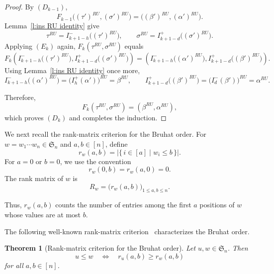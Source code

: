 \documentclass[12pt]{amsart}
\newtheorem{thm}{Theorem}[section]
\theoremstyle{definition}
\numberwithin{equation}{section}
\begin{document}
\begin{proof}
By $(D_{k-1})$,
\begin{equation*}
F_{k-1}
\bigl((\tau')^{RU},(\sigma')^{RU}\bigr)
=
\bigl((\beta')^{RU},(\alpha')^{RU}\bigr).
\end{equation*}
Lemma~\ref{l:ins RU identity} give
\begin{equation*}
\tau^{RU}
=
I_{k+1-h}^-\bigl((\tau')^{RU}\bigr),
\qquad
\sigma^{RU}
=
I_{k+1-d}^+\bigl((\sigma')^{RU}\bigr).
\end{equation*}
Applying $(E_k)$ again, $F_k(\tau^{RU},\sigma^{RU})$ equals
\begin{equation*}
F_k\left(
I_{k+1-h}^-\bigl((\tau')^{RU}\bigr),
I_{k+1-d}^+\bigl((\sigma')^{RU}\bigr)
\right)
=
\left(
I_{k+1-h}^-\bigl((\alpha')^{RU}\bigr),
I_{k+1-d}^+\bigl((\beta')^{RU}\bigr)
\right).
\end{equation*}
Using Lemma~\ref{l:ins RU identity} once more,
\begin{equation*}
I_{k+1-h}^-\bigl((\alpha')^{RU}\bigr)
=\bigr(I_h^+(\alpha')\bigr)^{RU}
=\beta^{RU},
\qquad
I_{k+1-d}^+\bigl((\beta')^{RU}\bigr)
= \bigr(I_d^-(\beta')\bigr)^{RU}
=\alpha^{RU}.
\end{equation*}

Therefore,
\begin{equation*}
F_k(\tau^{RU},\sigma^{RU})
=
(\beta^{RU},\alpha^{RU}),
\end{equation*}
which proves $(D_k)$ and completes the induction.
\end{proof}

We next recall the rank-matrix criterion for the Bruhat order. For
$w=w_1\cdots w_n\in\mathfrak{S}_n$ and $a,b\in[n]$, define
\begin{equation*}
r_w(a,b)
=
\left|\{\,i\in[a]\mid w_i\leq b\,\}\right|.
\end{equation*}
For $a=0$ or $b=0$, we use the convention
\begin{equation*}
r_w(0,b)=r_w(a,0)=0.
\end{equation*}
The rank matrix of $w$ is
\begin{equation*}
R_w
=
\bigl(r_w(a,b)\bigr)_{1\leq a,b\leq n}.
\end{equation*}

Thus, $r_w(a,b)$ counts the number of entries among the first $a$
positions of $w$ whose values are at most $b$.

The following well-known rank-matrix criterion~\cite[Theorem~2.1.5]{BBCoxeter} characterizes the
Bruhat order.

\begin{thm}[Rank-matrix criterion for the Bruhat order]\label{t:rank-matrix}
Let $u,w\in\mathfrak{S}_n$. Then
\begin{equation*}
u\leq w
\quad\Longleftrightarrow\quad
r_u(a,b)\geq r_w(a,b)
\end{equation*}
for all $a,b\in[n]$.
\end{thm}
\end{document}
